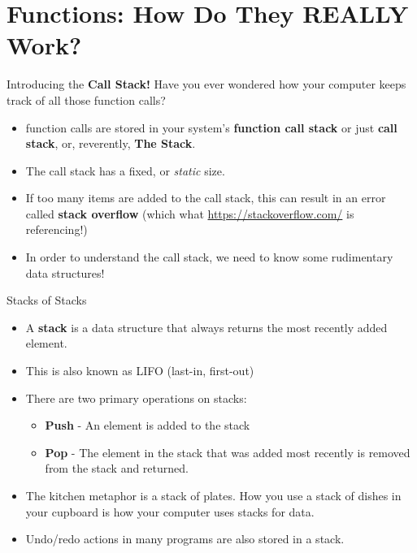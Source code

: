 \documentclass[11pt]{beamer}
\begin{document}
\section[Stack]{Functions: How Do They REALLY Work?}
\begin{frame}{Introducing the \textbf{Call Stack!}}
Have you ever wondered how your computer keeps track of all those function calls?  
\begin{itemize}
\item function calls are stored in your system's \textbf{function call stack} or just \textbf{call stack}, or, reverently, \textbf{The Stack}.
\item The call stack has a fixed, or \emph{static} size.
\item If too many items are added to the call stack, this can result in an error called \textbf{stack overflow} (which what \url{https://stackoverflow.com/} is referencing!)
\item In order to understand the call stack, we need to know some rudimentary data structures!
\end{itemize}
\end{frame}

\begin{frame}{Stacks of Stacks}
\begin{itemize}
\item A \textbf{stack} is a data structure that always returns the most recently added element.
\item This is also known as LIFO (last-in, first-out)
\item There are two primary operations on stacks:
	\begin{itemize}
	\item \textbf{Push} - An element is added to the stack
	\item \textbf{Pop} - The element in the stack that was added most recently is removed from the stack and returned.  
	\end{itemize}
\item The kitchen metaphor is a stack of plates.  How you use a stack of dishes in your cupboard is how your computer uses stacks for data.
\item Undo/redo actions in many programs are also stored in a stack. 
\end{itemize}
\end{frame}
\end{document}
